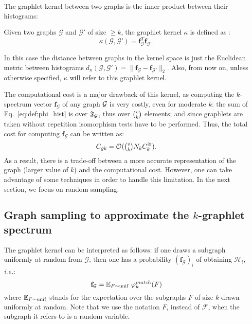 The graphlet kernel between two graphs is the inner product between their histograms:
\begin{definition}
	Given two graphs $\mathcal{G}$ and $\mathcal{G}'$ of size $\geq k$, the graphlet kernel $\kappa$ is defined as \citep{graphlet_kernel}:
	\begin{equation}
	\label{eq:graphlet_kernel}
	\kappa(\mathcal{G},\mathcal{G}')=\mathbf{f}_{\mathcal{G}}^T \mathbf{f}_{\mathcal{G}'}.
	\end{equation}
\end{definition}
In this case the distance between graphs in the kernel space is just the Euclidean metric between histograms $d_\kappa({\mathcal{G}},{\mathcal{G}'}) = \|\mathbf{f}_{\mathcal{G}} - \mathbf{f}_{{\mathcal{G}'}}\|_2$. Also, from now on, unless otherwise specified, $\kappa$ will refer to this graphlet kernel. 

The computational cost is a major drawback of this kernel, as computing the $k$-spectrum vector $\mathbf{f}_{\mathcal{G}}$ of any graph $\mathcal{G}$ is very costly, even for moderate $k$: the sum of Eq.~\eqref{eq:def:phi_hist} is over $\mathfrak{F}_{\mathcal{G}}$, thus over $\tbinom{v}{k}$ elements; and since graphlets are taken without repetition isomorphism tests have to be performed. Thus, the total cost for computing $\mathbf{f}_{\mathcal{G}}$ can be written as:
\begin{equation}
\label{eq:cost_graphlet}
C_{gk}= \mathcal{O}(\tbinom{v}{k} N_k C^{\cong}_k).
\end{equation}
As a result, there is a trade-off between a more accurate representation of the graph (larger value of $k$) and the computational cost. However, one can take advantage of some techniques in order to handle this limitation. In the next section, we focus on random sampling.

\subsection{Graph sampling to approximate the $k$-graphlet spectrum}
\label{graph_sampling}

The graphlet kernel can be interpreted as follows: if one draws a subgraph uniformly at random from $\mathcal{G}$, then one has a probability $(\mathbf{f}_\mathcal{G})_i$ of obtaining $\mathcal{H}_i$, \emph{i.e.}:
$$\mathbf{f}_\mathcal{G} = \mathbb{E}_{F \sim {\rm unif}} ~\varphi^{match}_k(F)$$
where $\mathbb{E}_{F \sim {\rm unif}}$ stands for the expectation over the subgraphs $F$ of size $k$ drawn uniformly at random. Note that we use the notation $F$, instead of $\mathcal{F}$, when the subgraph it refers to is a random variable. 

